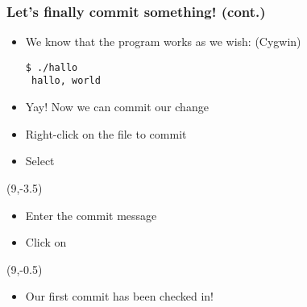 \begin{frame}[fragile]
    \frametitle{Let's finally commit something! (cont.)}
    \begin{itemize}
        \item We know that the program works as we wish: (Cygwin)
\begin{lstlisting}
$ ./hallo
 hallo, world
\end{lstlisting}
        \item Yay!  Now we can commit our change
        \item Right-click on the file to commit
        \item Select 
    \end{itemize}
    \begin{textblock}{0}(9,-3.5)
    \end{textblock}
    \begin{itemize}
        \item Enter the commit message
        \item Click on 
    \end{itemize}
    \begin{textblock}{0}(9,-0.5)
    \end{textblock}
    \begin{itemize}
        \item Our first commit has been checked in!
    \end{itemize}
\end{frame}

